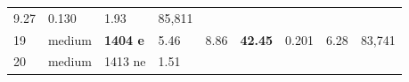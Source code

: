 \documentclass[
  10pt, ]{article}
\begin{document}
\begin{longtable}[]{@{}lllllllll@{}}
\begin{minipage}[t]{0.08\columnwidth}
9.27\strut
\end{minipage} & \begin{minipage}[t]{0.08\columnwidth}\raggedright
0.130\strut
\end{minipage} & \begin{minipage}[t]{0.08\columnwidth}\raggedright
1.93\strut
\end{minipage} & \begin{minipage}[t]{0.08\columnwidth}\raggedright
85,811\strut
\end{minipage}\tabularnewline
\begin{minipage}[t]{0.08\columnwidth}\raggedright
19\strut
\end{minipage} & \begin{minipage}[t]{0.08\columnwidth}\raggedright
medium\strut
\end{minipage} & \begin{minipage}[t]{0.08\columnwidth}\raggedright
\textbf{1404 e}\strut
\end{minipage} & \begin{minipage}[t]{0.08\columnwidth}\raggedright
5.46\strut
\end{minipage} & \begin{minipage}[t]{0.08\columnwidth}\raggedright
8.86\strut
\end{minipage} & \begin{minipage}[t]{0.08\columnwidth}\raggedright
\textbf{42.45}\strut
\end{minipage} & \begin{minipage}[t]{0.08\columnwidth}\raggedright
0.201\strut
\end{minipage} & \begin{minipage}[t]{0.08\columnwidth}\raggedright
6.28\strut
\end{minipage} & \begin{minipage}[t]{0.08\columnwidth}\raggedright
83,741\strut
\end{minipage}\tabularnewline
\begin{minipage}[t]{0.08\columnwidth}\raggedright
20\strut
\end{minipage} & \begin{minipage}[t]{0.08\columnwidth}\raggedright
medium\strut
\end{minipage} & \begin{minipage}[t]{0.08\columnwidth}\raggedright
1413 ne\strut
\end{minipage} & \begin{minipage}[t]{0.08\columnwidth}\raggedright
1.51\strut
\end{minipage} & \begin{minipage}[t]{0.08\columnwidth}\raggedright

\end{minipage}
\end{longtable}
\end{document}
